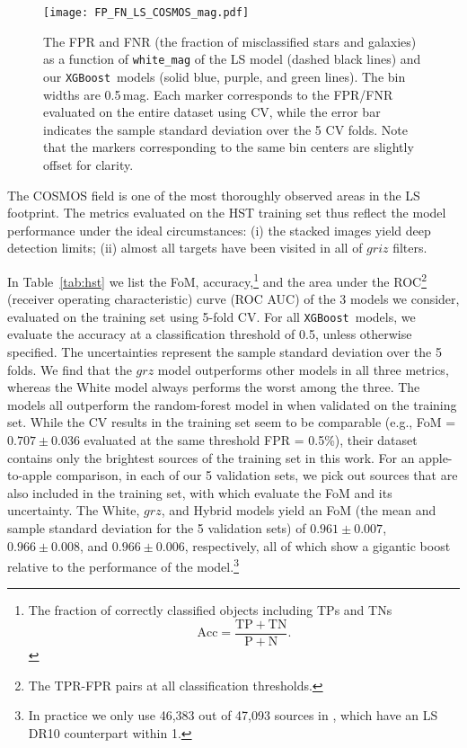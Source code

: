 \documentclass[twocolumn,tighten]{aastex631}
\newcommand{\xgboost}{\texttt{XGBoost}}
\newcommand{\dr}[1]{DR{#1}}
\begin{document}
\begin{CJK*}{UTF8}{gbsn}
\begin{figure}
    \centering
    \texttt{[image: FP\_FN\_LS\_COSMOS\_mag.pdf]}
    \caption{The FPR and FNR (the fraction of misclassified stars and galaxies) as a function of \texttt{white\_mag} of the LS model (dashed black lines) and our \xgboost\ models (solid blue, purple, and green lines). The bin widths are 0.5\,mag. Each marker corresponds to the FPR/FNR evaluated on the entire dataset using CV, while the error bar indicates the sample standard deviation over the 5 CV folds. Note that the markers corresponding to the same bin centers are slightly offset for clarity.}
    \label{fig:FPFN_mag}
\end{figure}

The COSMOS field is one of the most thoroughly observed areas in the LS footprint. The metrics evaluated on the HST training set thus reflect the model performance under the ideal circumstances: (i) the stacked images yield deep detection limits; (ii) almost all targets have been visited in all of $griz$ filters. 

In Table~\ref{tab:hst} we list the FoM, accuracy,\footnote{The fraction of correctly classified objects including TPs and TNs $$\mathrm{Acc = \frac{TP + TN}{P + N}}.$$} and the area under the ROC\footnote{The TPR-FPR pairs at all classification thresholds.} (receiver operating characteristic) curve (ROC AUC) of the 3 models we consider, evaluated on the training set using 5-fold CV. For all \xgboost\ models, we evaluate the accuracy at a classification threshold of 0.5, unless otherwise specified. The uncertainties represent the sample standard deviation over the 5 folds. We find that the $grz$ model outperforms other models in all three metrics, whereas the White model always performs the worst among the three. The models all outperform the random-forest model in  when validated on the training set. While the CV results in the  training set seem to be comparable (e.g., FoM = $0.707\pm0.036$ evaluated at the same threshold FPR = 0.5\%), their dataset contains only the brightest sources of the training set in this work. For an apple-to-apple comparison, in each of our 5 validation sets, we pick out sources that are also included in the  training set, with which evaluate the FoM and its uncertainty. The White, $grz$, and Hybrid models yield an FoM (the mean and sample standard deviation for the 5 validation sets) of $0.961\pm0.007$, $0.966\pm0.008$, and $0.966\pm0.006$, respectively, all of which show a gigantic boost relative to the performance of the  model.\footnote{In practice we only use 46,383 out of 47,093 sources in , which have an LS \dr{10} counterpart within 1\arcsec.}


\end{CJK*}
\end{document}
